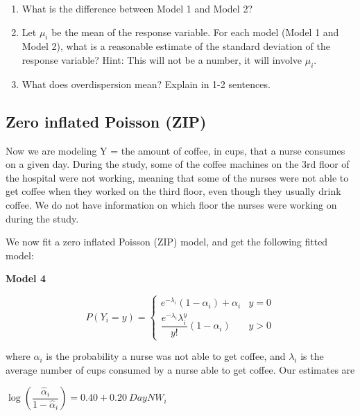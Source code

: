 \documentclass[11pt]{article}
\begin{document}
\begin{enumerate}
\item What is the difference between Model 1 and Model 2? 


\vspace{4cm} 


\item Let $\mu_i$ be the mean of the response variable. For each model (Model  1 and Model 2), what is a reasonable estimate of the standard deviation of the response variable? Hint: This will not be a number, it will involve $\mu_i$. 


\pagebreak



\item What does overdispersion mean? Explain in 1-2 sentences. 

\vspace{4cm}

\end{enumerate}


\subsection{Zero inflated Poisson (ZIP)}

Now we are modeling Y = the amount of coffee, in cups, that a nurse consumes on a given day. During the study, some of the coffee machines on the 3rd floor of the hospital were not working, meaning that some of the nurses were not able to get coffee when they worked on the third floor, even though they usually drink coffee. We do not have information on which floor the nurses were working on during the study.

We now fit a zero inflated Poisson (ZIP) model, and get the following fitted model:

\textbf{Model 4} 

$$P(Y_i = y) = \begin{cases} e^{-\lambda_i}(1 - \alpha_i) + \alpha_i & y = 0 \\ \dfrac{e^{-\lambda_i} \lambda_i^y}{y!}(1 - \alpha_i) & y > 0 \end{cases}$$

where $\alpha_i$ is the probability a nurse was not able to get coffee, and $\lambda_i$ is the average number of cups consumed by a nurse able to get coffee. Our estimates are

$\log \left( \dfrac{\widehat{\alpha}_i}{1 - \widehat{\alpha}_i} \right) = 0.40 + 0.20 \ DayNW_i$
\end{document}
